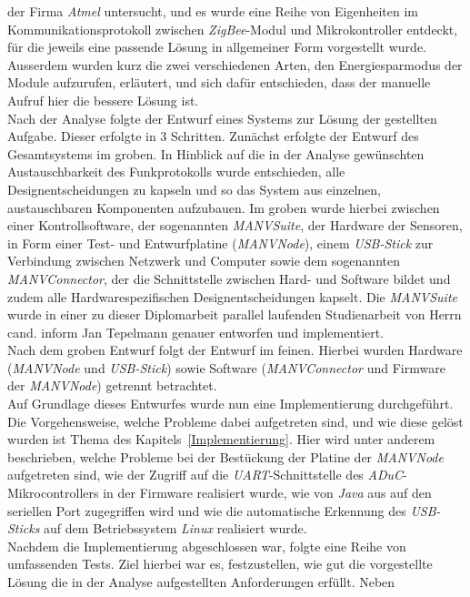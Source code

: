 der Firma \emph{Atmel} untersucht, und es wurde eine Reihe von Eigenheiten im Kommunikationsprotokoll 
zwischen \emph{ZigBee}-Modul und Mikrokontroller entdeckt, für die jeweils eine passende Lösung in 
allgemeiner Form vorgestellt wurde.  Ausserdem wurden kurz die zwei verschiedenen Arten, 
den Energiesparmodus der Module aufzurufen, erläutert, und sich dafür entschieden, dass der manuelle 
Aufruf hier die bessere Lösung ist.\\
Nach der Analyse folgte der Entwurf eines Systems zur Lösung der gestellten Aufgabe. Dieser erfolgte in 3 
Schritten. Zunächst erfolgte der Entwurf des Gesamtsystems im groben. In Hinblick auf die in der Analyse
gewünschten Austauschbarkeit des Funkprotokolls wurde entschieden, alle Designentscheidungen zu kapseln und
so das System aus einzelnen, austauschbaren Komponenten aufzubauen. Im groben wurde hierbei zwischen
einer Kontrollsoftware, der sogenannten \emph{MANVSuite}, der Hardware der Sensoren, in Form einer 
Test- und Entwurfplatine (\emph{MANVNode}), einem \emph{USB-Stick} zur Verbindung zwischen Netzwerk und Computer
sowie dem sogenannten \emph{MANVConnector}, der die Schnittstelle zwischen Hard- und Software bildet und zudem
alle Hardwarespezifischen Designentscheidungen kapselt. Die \emph{MANVSuite} wurde in einer
zu dieser Diplomarbeit parallel laufenden Studienarbeit von Herrn cand. inform Jan Tepelmann genauer entworfen
und implementiert.\cite{Jan}\\
Nach dem groben Entwurf folgt der Entwurf im feinen. Hierbei wurden Hardware (\emph{MANVNode} und \emph{USB-Stick})
sowie Software (\emph{MANVConnector} und Firmware der \emph{MANVNode}) getrennt betrachtet.\\
Auf Grundlage dieses Entwurfes wurde nun eine Implementierung durchgeführt. Die Vorgehensweise, welche Probleme
dabei aufgetreten sind, und wie diese gelöst wurden ist Thema des Kapitels~\ref{Implementierung}.
Hier wird unter anderem beschrieben, welche Probleme bei der Bestückung der Platine der \emph{MANVNode} aufgetreten
sind, wie der Zugriff auf die \emph{UART}-Schnittstelle des \emph{ADuC}-Mikrocontrollers in der Firmware
realisiert wurde, wie von \emph{Java} aus auf den seriellen Port zugegriffen wird und wie die automatische
Erkennung des \emph{USB-Sticks} auf dem Betriebssystem \emph{Linux} realisiert wurde.\\
Nachdem die Implementierung abgeschlossen war, folgte eine Reihe von umfassenden Tests. Ziel hierbei war es,
festzustellen, wie gut die vorgestellte Lösung die in der Analyse aufgestellten Anforderungen erfüllt. Neben

